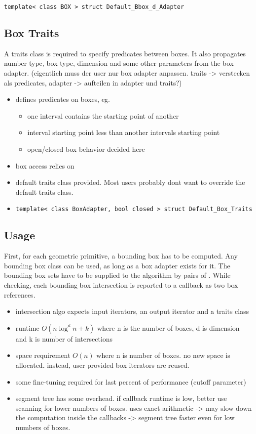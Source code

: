 \texttt{template< class BOX > struct Default\_Bbox\_d\_Adapter}

\subsection*{Box Traits}
A traits class is required to specify predicates between boxes. It also propagates number type, box type, dimension and some other parameters from the box adapter. (eigentlich muss der user nur box adapter anpassen. traits -> verstecken als predicates, adapter -> aufteilen in adapter und traits?)

\begin{itemize}
 \item defines predicates on boxes, eg.
 \begin{itemize}
  \item one interval contains the starting point of another
  \item interval starting point less than another intervals starting point    
  \item open/closed box behavior decided here
 \end{itemize}
 \item box access relies on 
 \item default traits class provided. Most users probably dont want to override the default traits class. 
 \item \texttt{template< class BoxAdapter, bool closed > struct Default\_Box\_Traits}
\end{itemize}

\subsection*{Usage}
First, for each geometric primitive, a bounding box has to be computed. Any bounding box class can be used, as long as a box adapter exists for it. The bounding box sets have to be supplied to the algorithm by pairs of . While checking, each bounding box intersection is reported to a callback as two box references.


\begin{itemize}
  \item intersection algo expects input iterators, an output iterator and a traits class
  \item runtime $O(n\log^{d}n+k)$ where n is the number of boxes, d is dimension and k is number of intersections
  \item space requirement $O(n)$ where n is number of boxes. no new space is allocated. instead, user provided box iterators are reused.
  \item some fine-tuning required for last percent of performance (cutoff parameter) 
  \item segment tree has some overhead. if callback runtime is low, better use scanning for lower numbers of boxes. \cgal uses exact arithmetic -> may slow down the computation inside the callbacks -> segment tree faster even for low numbers of boxes.  
\end{itemize}

